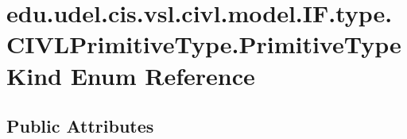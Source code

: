 \hypertarget{enumedu_1_1udel_1_1cis_1_1vsl_1_1civl_1_1model_1_1IF_1_1type_1_1CIVLPrimitiveType_1_1PrimitiveTypeKind}{}\section{edu.\+udel.\+cis.\+vsl.\+civl.\+model.\+I\+F.\+type.\+C\+I\+V\+L\+Primitive\+Type.\+Primitive\+Type\+Kind Enum Reference}
\label{enumedu_1_1udel_1_1cis_1_1vsl_1_1civl_1_1model_1_1IF_1_1type_1_1CIVLPrimitiveType_1_1PrimitiveTypeKind}
\subsection*{Public Attributes}
